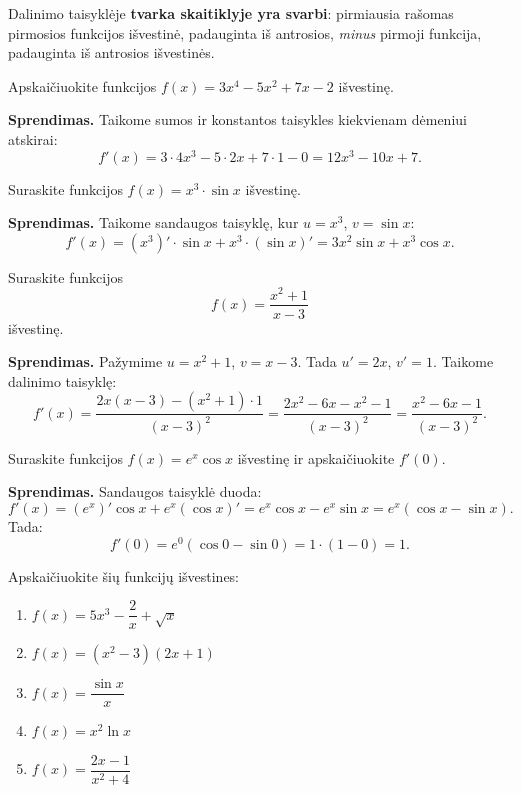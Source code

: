 \begin{remark}
Dalinimo taisyklėje \textbf{tvarka skaitiklyje yra svarbi}: pirmiausia rašomas
pirmosios funkcijos išvestinė, padauginta iš antrosios, \textit{minus} pirmoji funkcija,
padauginta iš antrosios išvestinės.
\end{remark}

\begin{example}
Apskaičiuokite funkcijos $f(x) = 3x^4 - 5x^2 + 7x - 2$ išvestinę.

\textbf{Sprendimas.} Taikome sumos ir konstantos taisykles kiekvienam dėmeniui atskirai:
\[
    f'(x) = 3\cdot 4x^3 - 5\cdot 2x + 7\cdot 1 - 0 = 12x^3 - 10x + 7.
\]
\end{example}

\begin{example}
Suraskite funkcijos $f(x) = x^3 \cdot \sin x$ išvestinę.

\textbf{Sprendimas.} Taikome sandaugos taisyklę, kur $u = x^3$, $v = \sin x$:
\[
    f'(x) = (x^3)' \cdot \sin x + x^3 \cdot (\sin x)' = 3x^2 \sin x + x^3 \cos x.
\]
\end{example}

\begin{example}
Suraskite funkcijos
\[
    f(x) = \frac{x^2 + 1}{x - 3}
\]
išvestinę.

\textbf{Sprendimas.} Pažymime $u = x^2+1$, $v = x-3$. Tada $u' = 2x$, $v' = 1$.
Taikome dalinimo taisyklę:
\[
    f'(x) = \frac{2x(x-3) - (x^2+1)\cdot 1}{(x-3)^2}
           = \frac{2x^2 - 6x - x^2 - 1}{(x-3)^2}
           = \frac{x^2 - 6x - 1}{(x-3)^2}.
\]
\end{example}

\begin{example}
Suraskite funkcijos $f(x) = e^x \cos x$ išvestinę ir apskaičiuokite $f'(0)$.

\textbf{Sprendimas.} Sandaugos taisyklė duoda:
\[
    f'(x) = (e^x)' \cos x + e^x (\cos x)' = e^x \cos x - e^x \sin x = e^x(\cos x - \sin x).
\]
Tada:
\[
    f'(0) = e^0(\cos 0 - \sin 0) = 1\cdot(1 - 0) = 1.
\]
\end{example}

\begin{exercise}
Apskaičiuokite šių funkcijų išvestines:
\begin{enumerate}[label=\arabic*.]
    \item $f(x) = 5x^3 - \dfrac{2}{x} + \sqrt{x}$
    \item $f(x) = (x^2 - 3)(2x + 1)$
    \item $f(x) = \dfrac{\sin x}{x}$
    \item $f(x) = x^2 \ln x$
    \item $f(x) = \dfrac{2x - 1}{x^2 + 4}$
\end{enumerate}
\end{exercise}

